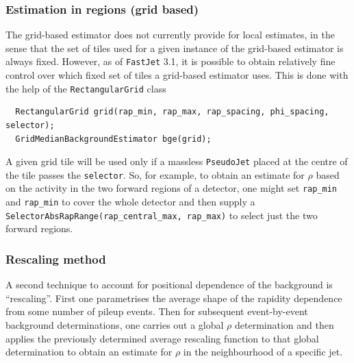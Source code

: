 \documentclass[12pt,a4]{article}
\newcommand{\fastjet}{\texttt{FastJet}\xspace}
\newcommand{\ttt}[1]{{\small\texttt{#1}}}
\begin{document}
\subsubsection{Estimation in regions (grid based)}
\label{sec:region-bkgd-estimation}

The grid-based estimator does not currently provide for local
estimates, in the sense that the set of tiles used for a given
instance of the grid-based estimator is always fixed.
%
However, as of \fastjet 3.1, it is possible to obtain relatively fine
control over which fixed set of tiles a grid-based estimator uses.
%
This is done with the help of the \ttt{RectangularGrid} class
%
\begin{lstlisting}
  RectangularGrid grid(rap_min, rap_max, rap_spacing, phi_spacing, selector);
  GridMedianBackgroundEstimator bge(grid);
\end{lstlisting}
A given grid tile will be used only if a massless \ttt{PseudoJet}
placed at the centre of the tile passes the \ttt{selector}.
%
So, for example, to obtain an estimate for $\rho$ based on the activity
in the two forward regions of a detector, one might set \ttt{rap\_min}
and \ttt{rap\_min} to cover the whole detector and then supply a
\ttt{SelectorAbsRapRange(rap\_central\_max, rap\_max)} to select just
the two forward regions.

\subsubsection{Rescaling method}
\label{sec:rescaled-bkgd-estimation}

A second technique to account for positional dependence of the
background is ``rescaling''.
%
First one parametrises the average shape of the rapidity
dependence from some number of pileup events.
%
Then for subsequent event-by-event background determinations, one
carries out a global $\rho$ determination and then applies the
previously determined average rescaling function to that global
determination to obtain an estimate for $\rho$ in the neighbourhood of
a specific jet.
\end{document}
